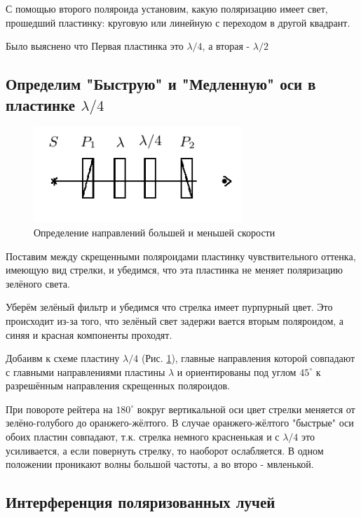 \documentclass{article}
\begin{document}
С помощью второго поляроида установим, какую поляризацию имеет свет, прошедший пластинку: круговую или линейную 
с переходом в другой квадрант.

Было выяснено что Первая пластинка это \(\lambda/4\), а вторая - \(\lambda/2\)

\subsection{Определим "Быструю" и "Медленную" оси в пластинке \( \lambda/4 \)}

\begin{figure}[H]
    \centering
    \includegraphics[width=0.7\textwidth]{high-low-speed-direction.png}
    \caption{Определение направлений большей и меньшей скорости}
    \label{fig:high-low}
\end{figure} 

Поставим между скрещенными поляроидами пластинку чувствительного оттенка, имеющую вид стрелки, и убедимся, что эта 
пластинка не меняет поляризацию зелёного света.

Уберём зелёный фильтр и убедимся что стрелка имеет пурпурный цвет. Это происходит из-за того, что зелёный свет задержи
вается вторым поляроидом, а синяя и красная компоненты проходят.

Добаивм к схеме пластину \( \lambda/4 \) (Рис. \ref{fig:high-low}), главные направления которой совпадают с главными направлениями
пластины \(\lambda\) и ориентированы под углом \(45^\circ\) к разрешённым направления скрещенных поляроидов.

При повороте рейтера на \( 180^\circ \) вокруг вертикальной оси цвет стрелки меняется от зелёно-голубого до оранжего-жёлтого.
В случае оранжего-жёлтого "быстрые" оси обоих пластин совпадают, т.к. стрелка немного красненькая и с \( \lambda/4 \) это усиливается,
а если повернуть стрелку, то наоборот ослабляется. В одном положении проникают волны большой частоты, а во второ - мвленькой.

\subsection{Интерференция поляризованных лучей}
\end{document}
